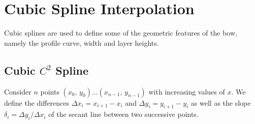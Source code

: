 
\chapter{Cubic Spline Interpolation}

Cubic splines are used to define some of the geometric features of the bow, namely the profile curve, width and layer heights.

\section{Cubic $C^2$ Spline}

Consider $n$ points $(x_{0},\,y_{0}) \ldots (x_{n-1},\,y_{n-1})$ with increasing values of $x$.
We define the differences $\Delta x_{i} = x_{i+1} - x_{i}$ and $\Delta y_{i} = y_{i+1} - y_{i}$ as well as the slope $\delta_{i} = \Delta y_{i} / \Delta x_{i}$ of the secant line between two successive points.

